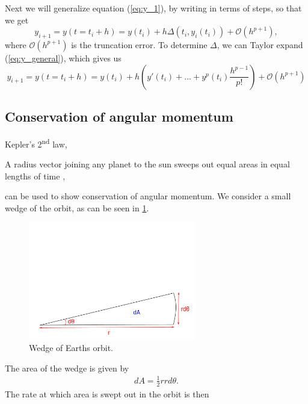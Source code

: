 \documentclass[../main.tex]{subfiles}
\begin{document}
Next we will generalize equation (\ref{eq:y_1}), by writing in terms of steps, so that we get
\begin{equation}\label{eq:y_general}
    y_{i + 1} = y(t= t_i + h) = y(t_i) + h \Delta (t_i , y_i (t_i)) + \mathcal{O}(h^{p + 1}), 
\end{equation}
where $\mathcal{O}(h^{p + 1})$ is the truncation error. To determine $\Delta$, we can Taylor expand (\ref{eq:y_general}), which gives us 
\begin{equation}
    y_{i + 1} = y(t= t_i + h) = y(t_i) + h \left( y'(t_i) + ... + y^{p}(t_i) \frac{h^{p - 1}}{p!} \right) + \mathcal{O}(h^{p + 1})
\end{equation}

\subsection{Conservation of angular momentum}
Kepler's 2\textsuperscript{nd} law, 

\begin{displayquote}
A radius vector joining any planet to the sun sweeps out equal areas in equal lengths of time \cite{Kepler2nd}, 
\end{displayquote} can be used to show conservation of angular momentum. We consider a small wedge of the orbit, as can be seen in \cref{fig:wedge}.

\begin{figure}[htb!]
    \centering
    \includegraphics[trim=1cm 0.5cm 0.cm 8.5cm, clip,width=0.65\textwidth]{../figures/wedge_of_orbit.pdf}
    \caption{Wedge of Earths orbit.}
    \label{fig:wedge}
\end{figure}

The area of the wedge is given by
\begin{align*}
    dA = \frac{1}{2}rrd\theta.
\end{align*} The rate at which area is swept out in the orbit is then 
\end{document}
